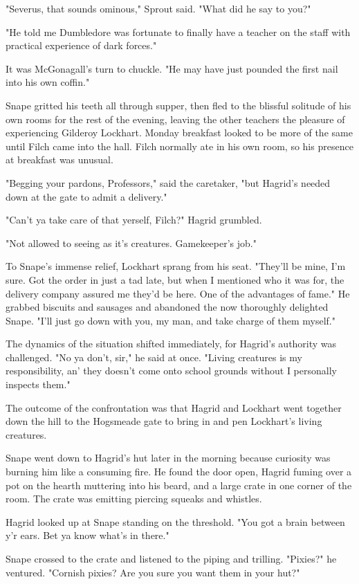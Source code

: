 "Severus, that sounds ominous," Sprout said. "What did he say to you?"

"He told me Dumbledore was fortunate to finally have a teacher on the staff with practical experience of dark forces."

It was McGonagall's turn to chuckle. "He may have just pounded the first nail into his own coffin."

Snape gritted his teeth all through supper, then fled to the blissful solitude of his own rooms for the rest of the evening, leaving the other teachers the pleasure of experiencing Gilderoy Lockhart. Monday breakfast looked to be more of the same until Filch came into the hall. Filch normally ate in his own room, so his presence at breakfast was unusual.

"Begging your pardons, Professors," said the caretaker, "but Hagrid's needed down at the gate to admit a delivery."

"Can't ya take care of that yerself, Filch?" Hagrid grumbled.

"Not allowed to seeing as it's creatures. Gamekeeper's job."

To Snape's immense relief, Lockhart sprang from his seat. "They'll be mine, I'm sure. Got the order in just a tad late, but when I mentioned who it was for, the delivery company assured me they'd be here. One of the advantages of fame." He grabbed biscuits and sausages and abandoned the now thoroughly delighted Snape. "I'll just go down with you, my man, and take charge of them myself."

The dynamics of the situation shifted immediately, for Hagrid's authority was challenged. "No ya don't, sir," he said at once. "Living creatures is my responsibility, an' they doesn't come onto school grounds without I personally inspects them."

The outcome of the confrontation was that Hagrid and Lockhart went together down the hill to the Hogsmeade gate to bring in and pen Lockhart's living creatures.

Snape went down to Hagrid's hut later in the morning because curiosity was burning him like a consuming fire. He found the door open, Hagrid fuming over a pot on the hearth muttering into his beard, and a large crate in one corner of the room. The crate was emitting piercing squeaks and whistles.

Hagrid looked up at Snape standing on the threshold. "You got a brain between y'r ears. Bet ya know what's in there."

Snape crossed to the crate and listened to the piping and trilling. "Pixies?" he ventured. "Cornish pixies? Are you sure you want them in your hut?"

